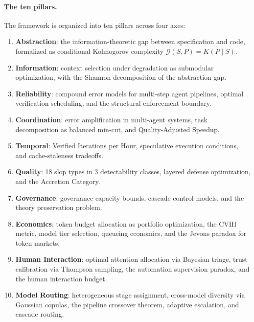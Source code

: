 \documentclass[11pt, a4paper]{googledeepmind}
\begin{document}
\paragraph{The ten pillars.} The framework is organized into ten pillars across four axes:

\begin{enumerate}[label=(\roman*)]
    \item \textbf{Abstraction}: the information-theoretic gap between specification and code, formalized as conditional Kolmogorov complexity $\mathcal{G}(S,P) = K(P \mid S)$.
    \item \textbf{Information}: context selection under degradation as submodular optimization, with the Shannon decomposition of the abstraction gap.
    \item \textbf{Reliability}: compound error models for multi-step agent pipelines, optimal verification scheduling, and the structural enforcement boundary.
    \item \textbf{Coordination}: error amplification in multi-agent systems, task decomposition as balanced min-cut, and Quality-Adjusted Speedup.
    \item \textbf{Temporal}: Verified Iterations per Hour, speculative execution conditions, and cache-staleness tradeoffs.
    \item \textbf{Quality}: 18 slop types in 3 detectability classes, layered defense optimization, and the Accretion Category.
    \item \textbf{Governance}: governance capacity bounds, cascade control models, and the theory preservation problem.
    \item \textbf{Economics}: token budget allocation as portfolio optimization, the CVIH metric, model tier selection, queueing economics, and the Jevons paradox for token markets.
    \item \textbf{Human Interaction}: optimal attention allocation via Bayesian triage, trust calibration via Thompson sampling, the automation supervision paradox, and the human interaction budget.
    \item \textbf{Model Routing}: heterogeneous stage assignment, cross-model diversity via Gaussian copulas, the pipeline crossover theorem, adaptive escalation, and cascade routing.
\end{enumerate}
\end{document}
